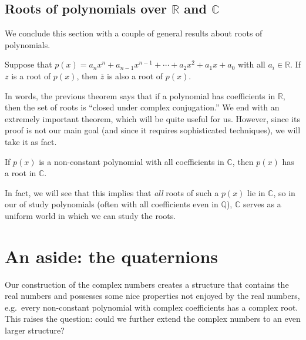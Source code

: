 \subsection{Roots of polynomials over  $\mathbb{R}$ and  $\mathbb{C}$}
We conclude this section with a couple of general results about roots of polynomials.

\begin{theorem}\label{thm.RootsRealCoeff}
Suppose that $p(x) = a_nx^n + a_{n-1}x^{n-1} +\cdots+a_2x^2+a_1x+a_0$ with all $a_i\in \mathbb{R}$. If $z$ is a root of $p(x)$, then $\overline{z}$ is also a root of $p(x)$.
\end{theorem}

In words, the previous theorem says that if a polynomial has coefficients in $\mathbb{R}$, then the set of roots is ``closed under complex conjugation.'' We end with an extremely important theorem, which will be quite useful for us. However, since its proof is not our main goal (and since it requires sophisticated techniques), we will take it as fact.

\begin{fact}\label{fact.FTA}
If $p(x)$ is a non-constant polynomial with all coefficients in $\mathbb{C}$, then $p(x)$ has a root in $\mathbb{C}$.
\end{fact}

In fact, we will see that this implies that \emph{all} roots of such a $p(x)$ lie in $\mathbb{C}$, so in our of study polynomials (often with all coefficients even in $\mathbb{Q}$), $\mathbb{C}$ serves as a uniform world in which we can study the roots.

\section{An aside: the quaternions}
Our construction of the complex numbers creates a structure that contains the real numbers and possesses some nice properties not enjoyed by the real numbers, e.g.~every non-constant polynomial with complex coefficients has a complex root.  This raises the question: could we further extend the complex numbers to an even larger structure?

